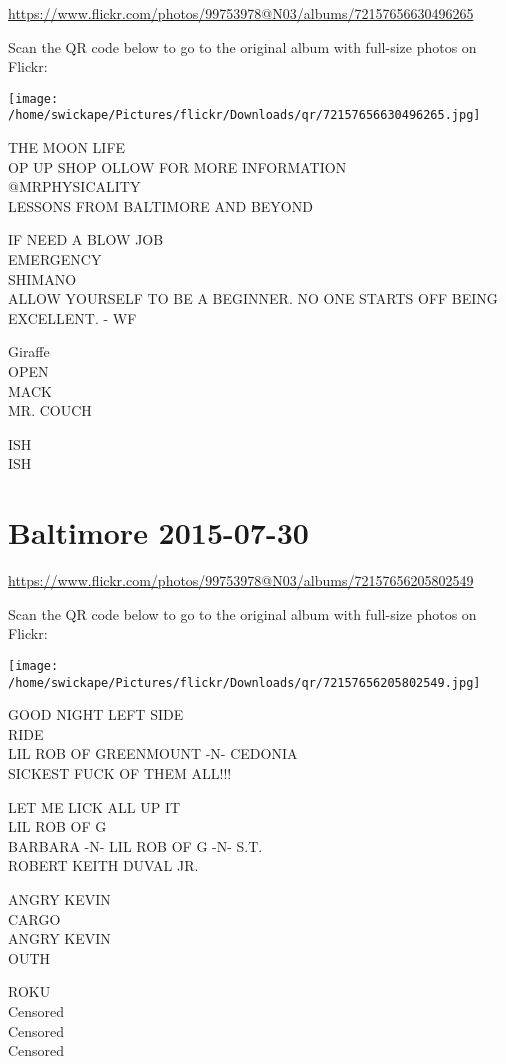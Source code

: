 \documentclass[10pt,letterpaper]{article}
\begin{document}
\url{https://www.flickr.com/photos/99753978@N03/albums/72157656630496265}

Scan the QR code below to go to the original album with full-size photos on Flickr:

\texttt{[image: /home/swickape/Pictures/flickr/Downloads/qr/72157656630496265.jpg]}


THE MOON LIFE\\
OP UP SHOP OLLOW FOR MORE INFORMATION\\
@MRPHYSICALITY\\
LESSONS FROM BALTIMORE AND BEYOND

IF NEED A BLOW JOB\\
EMERGENCY\\
SHIMANO\\
ALLOW YOURSELF TO BE A BEGINNER.  NO ONE STARTS OFF BEING EXCELLENT.  {-} WF

Giraffe\\
OPEN\\
MACK\\
MR. COUCH

ISH\\
ISH


\section*{Baltimore 2015-07-30}

\url{https://www.flickr.com/photos/99753978@N03/albums/72157656205802549}

Scan the QR code below to go to the original album with full-size photos on Flickr:

\texttt{[image: /home/swickape/Pictures/flickr/Downloads/qr/72157656205802549.jpg]}


GOOD NIGHT LEFT SIDE\\
RIDE\\
LIL ROB OF GREENMOUNT {-}N{-} CEDONIA\\
SICKEST FUCK OF THEM ALL!!!

LET ME LICK ALL UP IT\\
LIL ROB OF G\\
BARBARA {-}N{-} LIL ROB OF G {-}N{-} S.T.\\
ROBERT KEITH DUVAL JR.

ANGRY KEVIN\\
CARGO\\
ANGRY KEVIN\\
OUTH

ROKU\\
Censored\\
Censored\\
Censored
\end{document}
